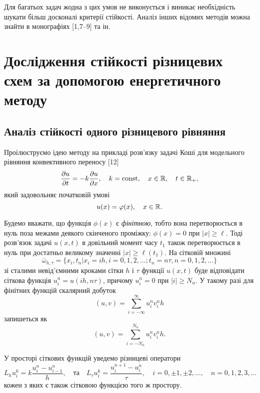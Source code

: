 Для багатьох задач жодна з цих умов не виконується і виникає необхідність шукати більш досконалі критерії стійкості. Аналіз інших відомих методів можна знайти в монографіях [1,7--9] та ін.

\section{Дослідження стійкості різницевих схем за допомогою енергетичного методу}

\subsection{Аналіз стійкості одного різницевого рівняння}

Проілюструємо ідею методу на прикладі розв'язку задачі Коші для модельного рівняння конвективного переносу [12]
\begin{equation}
    \label{eq:10.1}
    \frac{\partial u}{\partial t} = -k \frac{\partial u}{\partial x}, \quad k = \operatorname{const}, \quad x \in \mathbb{R}, \quad t \in \mathbb{R}_+,
\end{equation}
який задовольняє початковій умові
\begin{equation*}
    u(x) = \varphi(x), \quad x \in \mathbb{R}.
\end{equation*}

Будемо вважати, що функція $\phi(x)$ є \textit{фінітною}, тобто вона перетворюється в нуль поза межами деякого скінченого проміжку: $\phi(x) = 0$ при $|x| \ge \ell$. Тоді розв'язок задачі $u(x, t)$ в довільний момент часу $t_1$ також перетворюється в нуль при достатньо великому значенні $|x| \ge \ell(t_1)$. На сітковій множині
\begin{equation*}
    \bar \omega_{h, \tau} = \{x_i, t_n | x_i = i h, i = 0, 1, 2, \dots; t_n = n \tau, n = 0, 1, 2, \dots\}
\end{equation*}
зі сталими невід'ємними кроками сітки $h$ і $\tau$ функції $u(x, t)$ буде відповідати сіткова функція $u_i^n = u(ih, n \tau)$, причому $u_i^n = 0$ при $|i| \ge N_n$. У такому разі для фінітних функцій скалярний добуток 
\begin{equation*}
    (u, v) = \sum_{i = -\infty}^\infty u_i^n v_i^n h
\end{equation*}
запишеться як
\begin{equation*}
    (u, v) = \sum_{i = -N_n}^{N_n} u_i^n v_i^n h.
\end{equation*}

У просторі сіткових функцій уведемо різницеві оператори
\begin{equation*}
    L_h u_i^k = k \frac{u_i^n - u_{i-1}^n}{h}, \quad \text{та} \quad L_\tau u_i^k = \frac{u_i^{n+1} - u_i^n}{\tau}, \quad i = 0, \pm 1, \pm 2, \dots, \quad n = 0, 1, 2, 3, \dots
\end{equation*}
кожен з яких є також сітковою функцією того ж простору. \medskip


